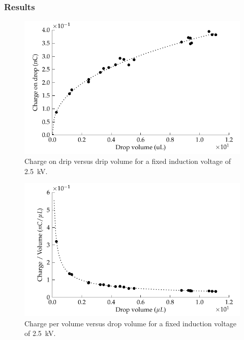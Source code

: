  \subsubsection*{Results}

    \begin{figure}
        \centering
        \includegraphics{content/appendices/chargedWaterDrops/graphics/dripper_chargeVsVolume}
        \caption{\label{Graph_dripperExperiment_chargeVsVolume}Charge on drip versus drip volume for a fixed induction voltage of \SI{2.5}{\kilo\volt}.}
    \end{figure}
    \begin{figure}
        \centering
        \includegraphics{content/appendices/chargedWaterDrops/graphics/dripper_chargePerVolumeVsVolume}
        \caption{\label{Figure_Graph_dripper_chargePerVolumeVsVolume}Charge per volume
        versus drop volume for a fixed induction voltage of \SI{2.5}{\kilo\volt}.}
    \end{figure}
